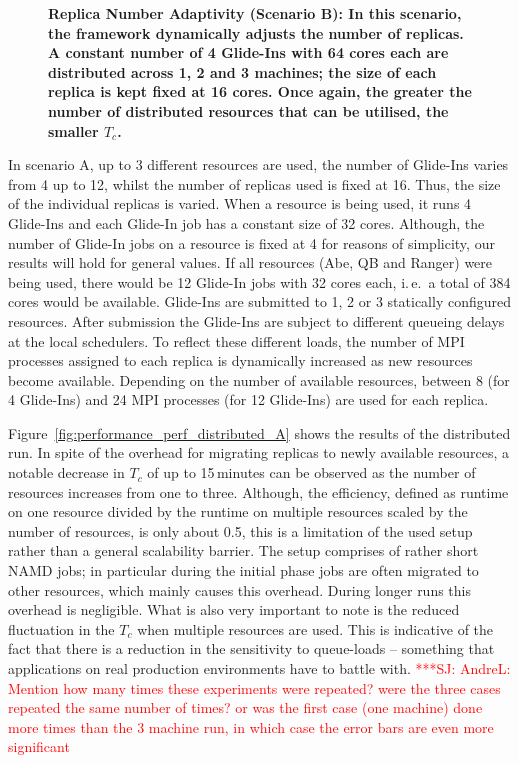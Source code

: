 \documentclass{rspublic}
\newcommand{\jhanote}[1]{ {\textcolor{red} { ***SJ: #1 }}}
\newcommand{\jhanote}[1]{}
\begin{document}
\begin{figure}[h]
\begin{minipage}[t]{.485\textwidth}
\begin{center}
      \caption{\footnotesize \bf Replica Number Adaptivity (Scenario
        B): In this scenario, the framework dynamically adjusts the
        number of replicas.  A constant number of 4 Glide-Ins with 64
        cores each are distributed across 1, 2 and 3 machines; the
        size of each replica is kept fixed at 16 cores. Once again,
        the greater the number of distributed resources that can be
        utilised, the smaller $T_{c}$.}
      \label{fig:performance_perf_distributed_B}
    \end{center}
  \end{minipage}
  \hfill
\end{figure}

In scenario A, up to 3 different resources are used, the number of
Glide-Ins varies from 4 up to 12, whilst the number of replicas used is
fixed at 16. Thus, the size of the individual replicas is varied.
When a resource is being used, it runs 4 Glide-Ins and each Glide-In
job has a constant size of 32 cores.  Although, the number of
Glide-In jobs on a resource is fixed at 4 for reasons of simplicity,
our results will hold for general values. If all
resources (Abe, QB and Ranger) were being used, there would be 12
Glide-In jobs with 32 cores each, i.\,e.\ a total of 384 cores would 
be available.  Glide-Ins
are submitted to 1, 2 or 3 statically configured resources. After submission
the Glide-Ins are subject to different queueing delays at the local
schedulers. To reflect these different loads, the number of
MPI processes assigned to each replica is dynamically
increased as new resources become available.
Depending on the number of available
resources, between 8 (for 4 Glide-Ins) and 24 MPI processes (for 12 Glide-Ins)
are used for each replica.

Figure~\ref{fig:performance_perf_distributed_A} shows the results of
the distributed run. In spite of the overhead for migrating replicas
to newly available resources, a notable decrease in $T_c$ of up to
15\,minutes can be observed as the number of resources increases from
one to three. Although, the efficiency, defined as runtime on one
resource divided by the runtime on multiple resources scaled by the
number of resources, is only about 0.5, this is a limitation of the
used setup rather than a general scalability barrier.  The setup
comprises of rather short NAMD jobs; in particular during the initial
phase jobs are often migrated to other resources, which mainly causes
this overhead. During longer runs this overhead is 
negligible. What is also very important to note is the reduced
fluctuation in the $T_c$ when multiple resources are used. This is
indicative of the fact that there is a reduction in the sensitivity to
queue-loads -- something that applications on real production
environments have to battle with.  \jhanote{AndreL: Mention how many
  times these experiments were repeated? were the three cases repeated
  the same number of times? or was the first case (one machine) done
  more times than the 3 machine run, in which case the error bars are
  even more significant}
\end{document}
